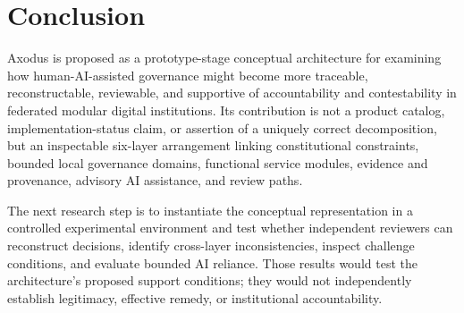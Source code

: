 \documentclass[11pt]{article}
\begin{document}
\section{Conclusion}

Axodus is proposed as a prototype-stage conceptual architecture for examining
how human-AI-assisted governance might become more traceable,
reconstructable, reviewable, and supportive of accountability and
contestability in federated modular digital institutions. Its contribution is
not a product catalog, implementation-status claim, or assertion of a uniquely
correct decomposition, but an inspectable six-layer arrangement linking
constitutional constraints, bounded local governance domains, functional
service modules, evidence and provenance, advisory AI assistance, and review
paths.

The next research step is to instantiate the conceptual representation in a
controlled experimental environment and test whether independent reviewers can
reconstruct decisions, identify cross-layer inconsistencies, inspect challenge
conditions, and evaluate bounded AI reliance. Those results would test the
architecture's proposed support conditions; they would not independently
establish legitimacy, effective remedy, or institutional accountability.

\renewcommand{\bibpreamble}{%
\noindent References are maintained in \texttt{references.bib}. Verification
records for all cited entries are maintained in the repository's bibliography
control records; final metadata rechecking is required before any submission,
public release, or external circulation.\par\medskip}


\end{document}
